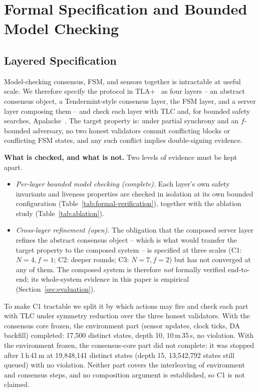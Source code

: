 \section{Formal Specification and Bounded Model Checking}
\label{sec:formal}

\subsection{Layered Specification}

Model-checking consensus, FSM, and sensors together is intractable at useful
scale. We therefore specify the protocol in TLA+~\cite{lamport2002specifying}
as four layers -- an abstract consensus object, a Tendermint-style consensus
layer, the FSM layer, and a server layer composing them -- and check each
layer with TLC and, for bounded safety searches, Apalache~\cite{konnov2019apalache}.
The target property is: under partial synchrony and an $f$-bounded
adversary, no two honest validators commit conflicting blocks or conflicting
FSM states, and any such conflict implies double-signing evidence.

\textbf{What is checked, and what is not.} Two levels of evidence must be
kept apart.
\begin{itemize}
  \item \emph{Per-layer bounded model checking (complete).} Each layer's own
  safety invariants and liveness properties are checked in isolation at its
  own bounded configuration (Table~\ref{tab:formal-verification}), together
  with the ablation study (Table~\ref{tab:ablation}).
  \item \emph{Cross-layer refinement (open).} The obligation that the
  composed server layer refines the abstract consensus object -- which is
  what would transfer the target property to the composed system -- is
  specified at three scales (C1: $N{=}4, f{=}1$; C2: deeper rounds; C3:
  $N{=}7, f{=}2$) but has not converged at any of them. The composed system
  is therefore \emph{not} formally verified end-to-end; its whole-system
  evidence in this paper is empirical (Section~\ref{sec:evaluation}).
\end{itemize}
To make C1 tractable we split it by which actions may fire and check each
part with TLC under symmetry reduction over the three honest validators. With
the consensus core frozen, the environment part (sensor updates, clock ticks,
DA backfill) completed: 17{,}500 distinct states, depth 10, 10\,m\,35\,s, no
violation. With the environment frozen, the consensus-core part did not
complete: it was stopped after 1\,h\,41\,m at 19{,}848{,}141 distinct states
(depth 15, 13{,}542{,}792 states still queued) with no violation. Neither part
covers the interleaving of environment and consensus steps, and no
composition argument is established, so C1 is not claimed.

